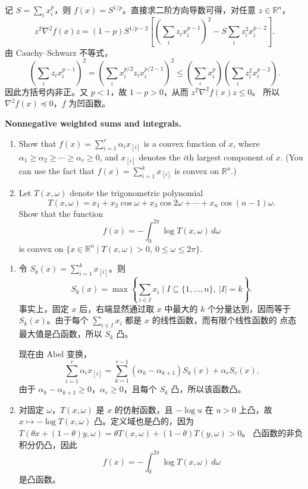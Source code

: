 \documentclass{ctexart}
\begin{document}
\begin{solution}
  记 $S=\sum_i x_i^p$，则 $f(x)=S^{1/p}$。直接求二阶方向导数可得，对任意
  $z\in\mathbb{R}^n$，
  \[
    z^T\nabla^2 f(x)z
    =(1-p)S^{1/p-2}
    \left[
      \left(\sum_i z_i x_i^{p-1}\right)^2
      -S\sum_i z_i^2x_i^{p-2}
    \right].
  \]
  由 Cauchy--Schwarz 不等式，
  \[
    \left(\sum_i z_i x_i^{p-1}\right)^2
    =
    \left(\sum_i x_i^{p/2}z_i x_i^{p/2-1}\right)^2
    \leq
    \left(\sum_i x_i^p\right)
    \left(\sum_i z_i^2x_i^{p-2}\right).
  \]
  因此方括号内非正。又 $p<1$，故 $1-p>0$，从而 $z^T\nabla^2 f(x)z\leq0$。
  所以 $\nabla^2 f(x)\preceq0$，$f$ 为凹函数。
\end{solution}

\begin{problem}\label{3.19}
  \textbf{Nonnegative weighted sums and integrals.}

  \begin{enumerate}
    \item Show that $f(x)=\sum_{i=1}^{r}\alpha_i x_{[i]}$ is a convex function of $x$,
      where $\alpha_1\geq\alpha_2\geq\cdots\geq\alpha_r\geq0$, and $x_{[i]}$ denotes
      the $i$th largest component of $x$. (You can use the fact that
      $f(x)=\sum_{i=1}^{k}x_{[i]}$ is convex on $\mathbb{R}^n$.)

    \item Let $T(x,\omega)$ denote the trigonometric polynomial
      \[
        T(x,\omega)=x_1+x_2\cos\omega+x_3\cos2\omega+\cdots+x_n\cos(n-1)\omega.
      \]
      Show that the function
      \[
        f(x)=-\int_0^{2\pi}\log T(x,\omega)\,d\omega
      \]
      is convex on $\{x\in\mathbb{R}^n\mid T(x,\omega)>0,\ 0\leq\omega\leq2\pi\}$.
  \end{enumerate}
\end{problem}

\begin{solution}
  \begin{enumerate}
    \item 令 $S_k(x)=\sum_{i=1}^k x_{[i]}$。则
      \[
        S_k(x)=\max\left\{\sum_{i\in I}x_i\mid I\subseteq\{1,\ldots,n\},\ |I|=k\right\}.
      \]
      事实上，固定 $x$ 后，右端显然通过取 $x$ 中最大的 $k$ 个分量达到，因而等于
      $S_k(x)$。由于每个 $\sum_{i\in I}x_i$ 都是 $x$ 的线性函数，而有限个线性函数的
      点态最大值是凸函数，所以 $S_k$ 凸。

      现在由 Abel 变换，
      \[
        \sum_{i=1}^r\alpha_i x_{[i]}
        =\sum_{k=1}^{r-1}(\alpha_k-\alpha_{k+1})S_k(x)+\alpha_rS_r(x).
      \]
      由于 $\alpha_k-\alpha_{k+1}\geq0$，$\alpha_r\geq0$，且每个 $S_k$ 凸，所以该函数凸。

    \item 对固定 $\omega$，$T(x,\omega)$ 是 $x$ 的仿射函数，且 $-\log u$ 在
      $u>0$ 上凸，故 $x\mapsto-\log T(x,\omega)$ 凸。定义域也是凸的，因为
      $T(\theta x+(1-\theta)y,\omega)=\theta T(x,\omega)+(1-\theta)T(y,\omega)>0$。
      凸函数的非负积分仍凸，因此
      \[
        f(x)=-\int_0^{2\pi}\log T(x,\omega)\,d\omega
      \]
      是凸函数。
  \end{enumerate}
\end{solution}
\end{document}
